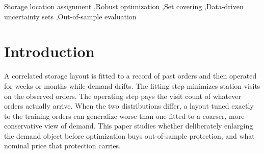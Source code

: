 \documentclass[preprint,review,11pt,authoryear]{elsarticle}
\begin{document}
\begin{frontmatter}
\begin{abstract}
construction pays a real, stable price and returns no out-of-sample protection at this enlargement level on this instance. We add two tests that complete the negative. A controlled affinity-drift stress-test builds data deliberately favorable to the method, with strong planted product communities and a future that grows exactly the combinations the closures encode; over the operating horizon the win-region stays empty, because the out-of-sample saving is never significantly positive while the nominal price is always paid. A decomposition of the lone industrial positive separates the two changes the first run made together, the covering enlargement and a workload-capacity recalibration, in a two-by-two of orders and capacity placed by one unmodified solver and scored on the same real test orders: the enlargement alone returns a negative-to-break-even gain, while the capacity loosening alone, with zero enlargement, delivers the entire apparent benefit and more, so the industrial positive was a workload-constraint relaxation, not the outer-approximation. We report the negative result as a contribution. The construction is sound and its robust-counterpart reading is exact, and for a deterministic correlation-clustering placement learned from a stable, well-sampled co-occurrence statistic the enlargement is redundant with the direct optimizer: it adds conservatism without reducing estimation variance, so it cannot improve out-of-sample.
\end{abstract}

\begin{keyword}
Storage location assignment \sep Robust optimization \sep Set covering \sep Data-driven uncertainty sets \sep Out-of-sample evaluation
\end{keyword}

\end{frontmatter}

\section{Introduction}\label{sec:rc-intro}

A correlated storage layout is fitted to a record of past orders and then operated for weeks or months while demand drifts. The fitting step minimizes station visits on the observed orders. The operating step pays the visit count of whatever orders actually arrive. When the two distributions differ, a layout tuned exactly to the training orders can generalize worse than one fitted to a coarser, more conservative view of demand. This paper studies whether deliberately enlarging the demand object before optimization buys out-of-sample protection, and what nominal price that protection carries.
\end{document}
